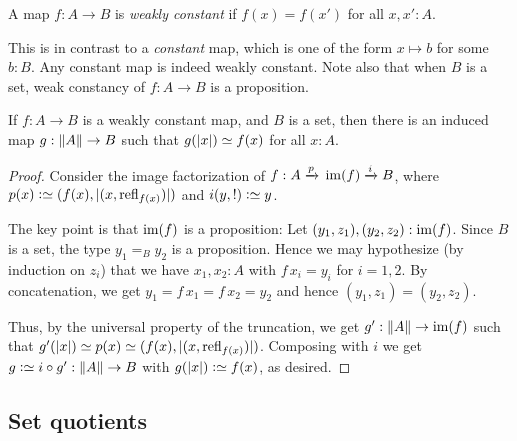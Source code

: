 \begin{definition}
  A map $f: A \to B$ is \emph{weakly constant} if $f(x) = f(x')$ for all $x,x':A$.
\end{definition}
This is in contrast to a \emph{constant} map,
which is one of the form $x \mapsto b$ for some $b:B$.
Any constant map is indeed weakly constant.
Note also that when $B$ is a set,
weak constancy of $f : A \to B$ is a proposition.

\begin{theorem}\label{thm:wconstant-elim}
  If $f : A \to B$ is a weakly constant map, and $B$ is a set, then
  there is an induced map $g : \lVert A\rVert \to B$ such that
  $g(\trunc x)\jdeq f(x)$ for all $x:A$.
\end{theorem}
\begin{proof}
  Consider the image factorization of $f : A \xrightarrow{p}{} \im(f)
  \xrightarrow{i}{} B$,
  where $p(x) \defeq (f(x),\trunc{(x,\refl{f(x)})})$
  and $i(y,!) \defeq y$.

  The key point is that $\im(f)$ is a proposition: Let
  $(y_1,z_1),(y_2,z_2):\im(f)$. Since $B$ is a set, the type $y_1=_B
  y_2$ is a proposition. Hence we may hypothesize (by induction on $z_i$)
  that we have $x_1,x_2:A$ with
  $f\,x_i = y_i$ for $i=1,2$. By concatenation, we get
  $y_1=f\,x_1=f\,x_2=y_2$ and hence $(y_1,z_1)=(y_2,z_2)$.

  Thus, by the universal property of the truncation,
  we get $g' : \Trunc A \to \im(f)$ such
  that $g'(\trunc x) \jdeq p(x) \jdeq (f(x),\trunc{(x,\refl{f(x)})})$.
  Composing with $i$ we get $g\defeq i\circ g' : \Trunc A \to B$
  with $g(\trunc x) \defeq f(x)$, as desired.
\end{proof}

\subsection{Set quotients}

